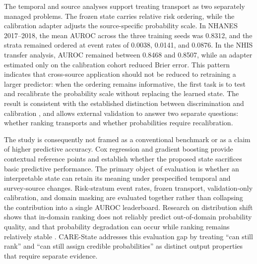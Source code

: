 \documentclass[12pt]{article}
\begin{document}
The temporal and source analyses support treating transport as two separately managed problems. The frozen state carries relative risk ordering, while the calibration adapter adjusts the source-specific probability scale. In NHANES 2017--2018, the mean AUROC across the three training seeds was 0.8312, and the strata remained ordered at event rates of 0.0038, 0.0141, and 0.0876. In the NHIS transfer analysis, AUROC remained between 0.8468 and 0.8507, while an adapter estimated only on the calibration cohort reduced Brier error. This pattern indicates that cross-source application should not be reduced to retraining a larger predictor: when the ordering remains informative, the first task is to test and recalibrate the probability scale without replacing the learned state. The result is consistent with the established distinction between discrimination and calibration \cite{steyerberg_2010_prediction,van_calster_2019_calibration}, and allows external validation to answer two separate questions: whether ranking transports and whether probabilities require recalibration.

The study is consequently not framed as a conventional benchmark or as a claim of higher predictive accuracy. Cox regression and gradient boosting provide contextual reference points and establish whether the proposed state sacrifices basic predictive performance. The primary object of evaluation is whether an interpretable state can retain its meaning under prespecified temporal and survey-source changes. Risk-stratum event rates, frozen transport, validation-only calibration, and domain masking are evaluated together rather than collapsing the contribution into a single AUROC leaderboard. Research on distribution shift shows that in-domain ranking does not reliably predict out-of-domain probability quality, and that probability degradation can occur while ranking remains relatively stable \cite{koh_2021_wilds,ovadia_2019_uncertainty}. CARE-State addresses this evaluation gap by treating ``can still rank'' and ``can still assign credible probabilities'' as distinct output properties that require separate evidence.
\end{document}
